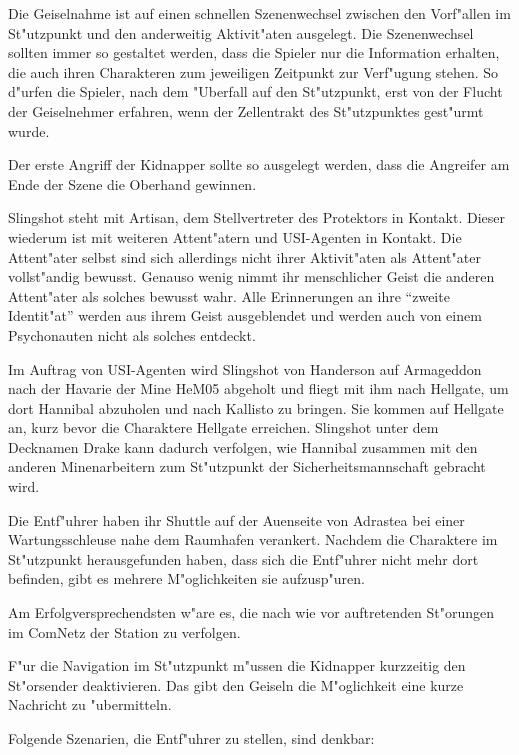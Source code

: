 \begin{remarks}
	Die Geiselnahme ist auf einen schnellen Szenenwechsel zwischen den Vorf"allen im St"utzpunkt und den anderweitig Aktivit"aten ausgelegt. Die Szenenwechsel sollten immer so gestaltet werden, dass die Spieler nur die Information erhalten, die auch ihren Charakteren zum jeweiligen Zeitpunkt zur Verf"ugung stehen. So d"urfen die Spieler, nach dem "Uberfall auf den St"utzpunkt, erst von der Flucht der Geiselnehmer erfahren, wenn der Zellentrakt des St"utzpunktes gest"urmt wurde.
	
	Der erste Angriff der Kidnapper sollte so ausgelegt werden, dass die Angreifer am Ende der Szene die Oberhand gewinnen.

	Slingshot steht mit Artisan, dem Stellvertreter des Protektors in Kontakt. Dieser wiederum ist mit weiteren Attent"atern und USI-Agenten in Kontakt. Die Attent"ater selbst sind sich allerdings nicht ihrer Aktivit"aten als Attent"ater vollst"andig bewusst. Genauso wenig nimmt ihr menschlicher Geist die anderen Attent"ater als solches bewusst wahr. Alle Erinnerungen an ihre ``zweite Identit"at'' werden aus ihrem Geist ausgeblendet und werden auch von einem Psychonauten nicht als solches entdeckt.
	
	Im Auftrag von USI-Agenten wird Slingshot von Handerson auf Armageddon nach der Havarie der Mine HeM05 abgeholt und fliegt mit ihm nach Hellgate, um dort Hannibal abzuholen und nach Kallisto zu bringen. Sie kommen auf Hellgate an, kurz bevor die Charaktere Hellgate erreichen. Slingshot unter dem Decknamen Drake kann dadurch verfolgen, wie Hannibal zusammen mit den anderen Minenarbeitern zum St"utzpunkt der Sicherheitsmannschaft gebracht wird.
\end{remarks}



Die Entf"uhrer haben ihr Shuttle auf der Au\3enseite von Adrastea bei einer Wartungsschleuse nahe dem Raumhafen verankert. Nachdem die Charaktere im St"utzpunkt herausgefunden haben, dass sich die Entf"uhrer nicht mehr dort befinden, gibt es mehrere M"oglichkeiten sie aufzusp"uren. 

Am Erfolgversprechendsten w"are es, die nach wie vor auftretenden St"orungen im ComNetz der Station zu verfolgen. 

F"ur die Navigation im St"utzpunkt m"ussen die Kidnapper kurzzeitig den St"orsender deaktivieren. Das gibt den Geiseln die M"oglichkeit eine kurze Nachricht zu "ubermitteln.

Folgende Szenarien, die Entf"uhrer zu stellen, sind denkbar:

